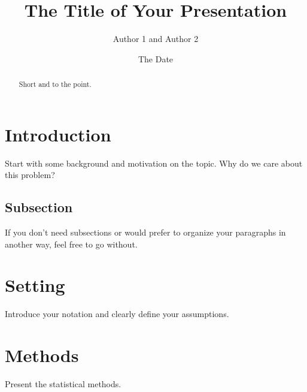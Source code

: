 \documentclass[english, 11pt]{article}
\begin{document}
\title{The Title of Your Presentation}


\author{Author 1 and Author 2}


\date{The Date}
\maketitle
\begin{abstract}
Short and to the point.

\newpage{}
\end{abstract}





\section{Introduction}

Start with some background and motivation on the topic. Why do we
care about this problem?


\subsection{Subsection }

If you don't need subsections or would prefer to organize your paragraphs
in another way, feel free to go without.




\section{Setting}

Introduce your notation and clearly define your assumptions. 







\section{Methods}

Present the statistical methods.
\end{document}
